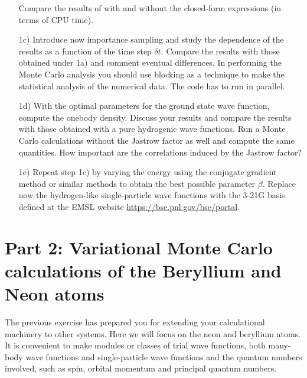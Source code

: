 \documentclass[10pt]{article}
\begin{document}
\begin{enumerate}
Compare the results of with and without the closed-form expressions (in terms of CPU time).
\item[1c)] Introduce now importance sampling and study the dependence of the results as a function of the time step $\delta t$.  
Compare the results with those obtained under 1a) and comment eventual differences.
In performing the Monte Carlo analysis you should use blocking as a technique  to make the statistical analysis of the numerical data.
The code has to run in parallel. 
\item[1d)]  With the optimal parameters for the ground state wave function, compute the onebody density. Discuss your results and compare the results with those obtained with a pure hydrogenic wave functions. Run a Monte Carlo calculations without the Jastrow factor as well
and compute the same quantities. How important are the correlations induced by the Jastrow factor?

\item[1e)]  Repeat step 1c) by varying the energy using the 
conjugate gradient method or similar methods to obtain the best possible parameter
$\beta$.  Replace now the hydrogen-like single-particle wave functions with the 3-21G basis defined 
at the EMSL website \url{https://bse.pnl.gov/bse/portal}. 

\end{enumerate}


\section*{Part 2: Variational Monte Carlo calculations of the Beryllium and  Neon atoms}
The previous exercise has prepared you for extending your calculational machinery  to other systems.
Here we will focus on the neon and beryllium atoms.
It is convenient to make modules or classes of trial wave functions, both many-body wave functions
and single-particle wave functions  and the quantum numbers  involved, such as spin, orbital momentum and principal
quantum numbers.
\end{document}
